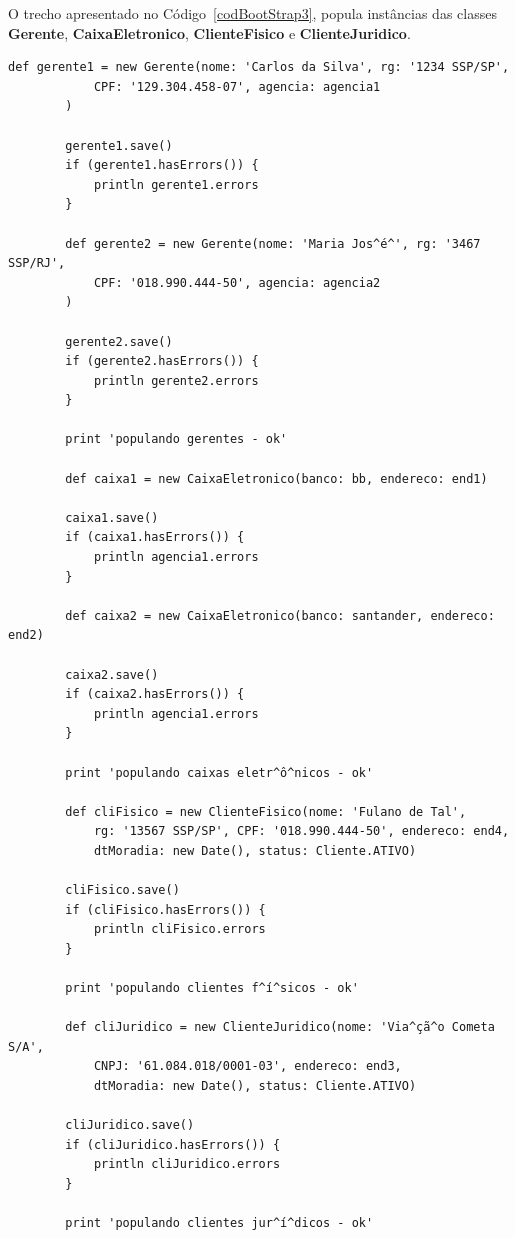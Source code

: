 \newpage

O  trecho  apresentado  no  Código~\ref{codBootStrap3},  popula  instâncias  das
classes  {\bf  Gerente},  {\bf  CaixaEletronico},  {\bf  ClienteFisico}  e  {\bf
  ClienteJuridico}. 

\begin{lstlisting}[caption={\bf BootStrap.groovy (3)}, frame = trBL, float=htbp,
    label=codBootStrap3] 
        def gerente1 = new Gerente(nome: 'Carlos da Silva', rg: '1234 SSP/SP',
            CPF: '129.304.458-07', agencia: agencia1
        )
    
        gerente1.save()
        if (gerente1.hasErrors()) {
            println gerente1.errors
        }
        
        def gerente2 = new Gerente(nome: 'Maria Jos^é^', rg: '3467 SSP/RJ',
            CPF: '018.990.444-50', agencia: agencia2
        )
    
        gerente2.save()
        if (gerente2.hasErrors()) {
            println gerente2.errors
        }
        
        print 'populando gerentes - ok'
        
        def caixa1 = new CaixaEletronico(banco: bb, endereco: end1)
        
        caixa1.save()
        if (caixa1.hasErrors()) {
            println agencia1.errors
        }
        
        def caixa2 = new CaixaEletronico(banco: santander, endereco: end2)
        
        caixa2.save()
        if (caixa2.hasErrors()) {
            println agencia1.errors
        }
        
        print 'populando caixas eletr^ô^nicos - ok'
        
        def cliFisico = new ClienteFisico(nome: 'Fulano de Tal', 
            rg: '13567 SSP/SP', CPF: '018.990.444-50', endereco: end4,
            dtMoradia: new Date(), status: Cliente.ATIVO) 
        
        cliFisico.save()
        if (cliFisico.hasErrors()) {
            println cliFisico.errors
        }
        
        print 'populando clientes f^í^sicos - ok'
                
        def cliJuridico = new ClienteJuridico(nome: 'Via^çã^o Cometa S/A', 
            CNPJ: '61.084.018/0001-03', endereco: end3,
            dtMoradia: new Date(), status: Cliente.ATIVO) 
        
        cliJuridico.save()
        if (cliJuridico.hasErrors()) {
            println cliJuridico.errors
        }
        
        print 'populando clientes jur^í^dicos - ok'
\end{lstlisting}

